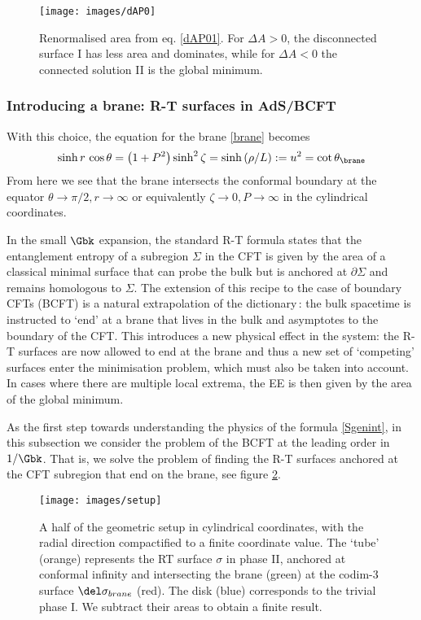 \begin{figure}[h]
\begin{center}
\texttt{[image: images/dAP0]}
\caption{Renormalised area from eq. \eqref{dAP01}. For $\Delta A>0$, the disconnected surface I has less area and dominates, while for $\Delta A<0$ the connected solution II is the global minimum.}
\label{figdeltaA}
\end{center}
\end{figure}


\subsubsection{Introducing a brane: R-T surfaces in AdS/BCFT}\label{AdS/BCFT}

With this choice, the equation for the brane \eqref{brane} becomes
\begin{align}\label{}
\sinh r\, \cos\theta=\left( 1+P^2 \right)\sinh^2\zeta=\sinh\left( \rho/L \right):=u^2=\cot\theta_\brane
\label{eq:foobar}
\end{align}
From here we see that the brane intersects the conformal boundary at the equator $\theta\to\pi/2,r\to\infty$ or equivalently $\zeta\to 0,P\to \infty$ in the cylindrical coordinates.

In the small $\Gbk$ expansion, the standard R-T formula states that the entanglement entropy of a subregion $\Sigma$ in the CFT is given by the area of a classical minimal surface that can probe the bulk but is anchored at $\partial \Sigma$ and remains homologous to $\Sigma$. The extension of this recipe to the case of boundary CFTs (BCFT) is a natural extrapolation of the dictionary\,\cite{Takayanagi:2011zk}: the bulk spacetime is instructed to `end' at a brane that lives in the bulk and asymptotes to the boundary of the CFT. This introduces a new physical effect in the system: the R-T surfaces are now allowed to end at the brane and thus a new set of `competing' surfaces enter the minimisation problem, which must also be taken into account. In cases where there are multiple local extrema, the EE is then given by the area of the global minimum.

As the first step towards understanding the physics of the formula \eqref{Sgenint}, in this subsection we consider the problem of the BCFT at the leading order in $1/\Gbk$. That is, we solve the problem of finding the R-T surfaces anchored at the CFT subregion that end on the brane, see figure \ref{figsetup}.
\begin{figure}[h]
\begin{center}
\texttt{[image: images/setup]}
\caption{A half of the geometric setup in cylindrical coordinates, with the radial direction compactified to a finite coordinate value. The `tube' (orange) represents the RT surface $\sigma$ in phase II, anchored at conformal infinity and intersecting the brane (green) at the codim-$3$ surface $\del\sigma_{brane}$ (red). The disk (blue) corresponds to the trivial phase I. We subtract their areas to obtain a finite result. }
\label{figsetup}
\end{center}
\end{figure}

